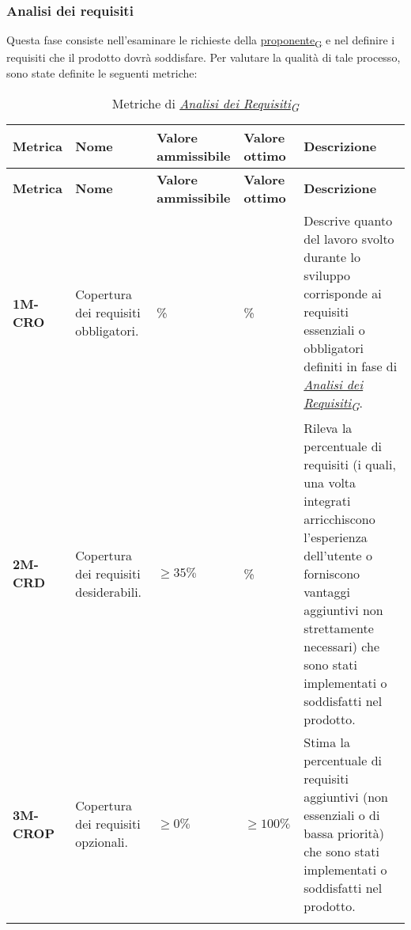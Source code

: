 \subsubsection{Analisi dei requisiti}
Questa fase consiste nell'esaminare le richieste della \href{https://7last.github.io/docs/rtb/documentazione-interna/glossario\#proponente}{proponente\textsubscript{G}} e nel definire i requisiti che il prodotto dovrà soddisfare. Per valutare la qualità di tale processo, sono state definite le seguenti metriche:
\begin{longtable}{|>{\raggedright\arraybackslash}m{}|>{\raggedright\arraybackslash}m{}|>{\raggedright\arraybackslash}m{}|>{\raggedright\arraybackslash}m{}|>{\raggedright\arraybackslash}m{}|}
	\hline
	\textbf{Metrica} & \textbf{Nome} & \textbf{Valore ammissibile} & \textbf{Valore ottimo} & \textbf{Descrizione}\\
	\hline
	\endfirsthead
	\hline
	\textbf{Metrica} & \textbf{Nome} & \textbf{Valore ammissibile} & \textbf{Valore ottimo} & \textbf{Descrizione}\\
	\endhead
	\textbf{1M-CRO}  & Copertura dei requisiti obbligatori.  & 100\% & 100\% & Descrive quanto del lavoro svolto durante lo sviluppo corrisponde ai requisiti essenziali o obbligatori definiti in fase di \href{https://7last.github.io/docs/rtb/documentazione-interna/glossario\#analisi-dei-requisiti}{\textit{Analisi dei Requisiti\textsubscript{G}}}.\\
	\hline
	\textbf{2M-CRD}  & Copertura dei requisiti desiderabili. & $\geq 35\% $ & 100\% & Rileva la percentuale di requisiti (i quali, una volta integrati arricchiscono l'esperienza dell'utente o forniscono vantaggi aggiuntivi non strettamente necessari) che sono stati implementati o soddisfatti nel prodotto. \\
	\hline
	\textbf{3M-CROP} & Copertura dei requisiti opzionali. & $\geq 0\% $ & $\geq 100\% $ & Stima la percentuale di requisiti aggiuntivi (non essenziali o di bassa priorità) che sono stati implementati o soddisfatti nel prodotto.\\
	\hline
	\caption{Metriche di \href{https://7last.github.io/docs/rtb/documentazione-interna/glossario\#analisi-dei-requisiti}{\textit{Analisi dei Requisiti\textsubscript{G}}}}
	\label{table:1}
\end{longtable}

